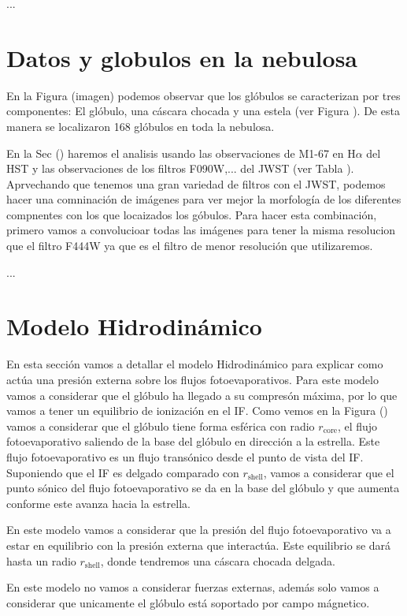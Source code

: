\documentclass[twocolumn, times]{aastex631}
\begin{document}
...

\section{Datos y globulos en la nebulosa}
\label{sec:globulos en la nebulosa}

En la Figura (imagen) podemos observar que los glóbulos se caracterizan por tres componentes: El glóbulo, una cáscara chocada y una estela (ver Figura ). De esta manera se localizaron 168 glóbulos en toda la nebulosa.

En la Sec () haremos el analisis usando las observaciones de M1-67 en H$\alpha$ del HST y las observaciones de los filtros F090W,... del JWST (ver Tabla ). Aprvechando que tenemos una gran variedad de filtros con el JWST, podemos hacer una comninación de imágenes para ver mejor la morfología de los diferentes compnentes con los que locaizados los góbulos. Para hacer esta combinación, primero vamos a convolucioar todas las imágenes para tener la misma resolucion que el filtro F444W ya que es el filtro de menor resolución que utilizaremos.

...

\section{Modelo Hidrodinámico}
\label{Sec:Modelo}

En esta sección vamos a detallar el modelo Hidrodinámico para explicar como actúa una presión externa sobre los flujos fotoevaporativos.
Para este modelo vamos a considerar que el glóbulo ha llegado a su compresón máxima, por lo que vamos a tener un equilibrio de ionización en el IF. Como vemos en la Figura () vamos a considerar que el glóbulo tiene forma esférica con radio $r_\mathrm{core}$, el flujo fotoevaporativo saliendo de la base del glóbulo en dirección a la estrella. Este flujo fotoevaporativo es un flujo transónico desde el punto de vista del IF. Suponiendo que el IF es delgado comparado con $r_\mathrm{shell}$, vamos a considerar que el punto sónico del flujo fotoevaporativo se da en la base del glóbulo y que aumenta conforme este avanza hacia la estrella.

En este modelo vamos a considerar que la presión del flujo fotoevaporativo va a estar en equilibrio con la presión externa que interactúa. Este equilibrio se dará hasta un radio $r_\mathrm{shell}$, donde tendremos una cáscara chocada delgada.

En este modelo no vamos a considerar fuerzas externas, además solo vamos a considerar que unicamente el glóbulo está soportado por campo mágnetico.
\end{document}
